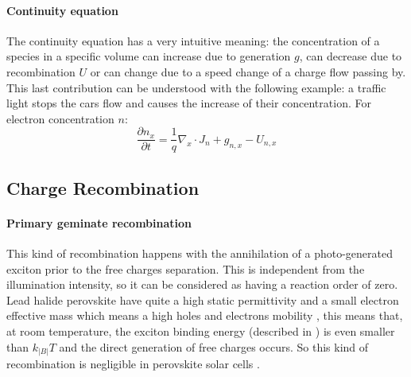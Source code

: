 		\paragraph{Continuity equation}
		The continuity equation has a very intuitive meaning: the concentration of a species in a specific volume can increase due to generation $g$, can decrease due to recombination $U$ or can change due to a speed change of a charge flow passing by.
		This last contribution can be understood with the following example: a traffic light stops the cars flow and causes the increase of their concentration.
		For electron concentration $n$:
		\begin{equation}\label{eq_continuity}
			\frac{\partial n_x}{\partial t} = \frac{1}{q}\nabla_x \cdot J_n + g_{n,x} - U_{n,x}
		\end{equation}

	\subsection{Charge Recombination}

		\paragraph{Primary geminate recombination} \label{intro_geminate}
		This kind of recombination happens with the annihilation of a photo-generated exciton prior to the free charges separation.
		This is independent from the illumination intensity, so it can be considered as having a reaction order of zero.
		Lead halide perovskite have quite a high static permittivity \cite{Moia2019} and a small electron effective mass \cite{Herz2017} which means a high holes and electrons mobility \cite{Leijtens2014}, this means that, at room temperature, the exciton binding energy (described in ) is even smaller than $k_|B|T$ \cite{Miyata2015,Galkowski2016,Tvingstedt2015} and the direct generation of free charges occurs.
		So this kind of recombination is negligible in perovskite solar cells \cite{Wehrenfennig2014}.

